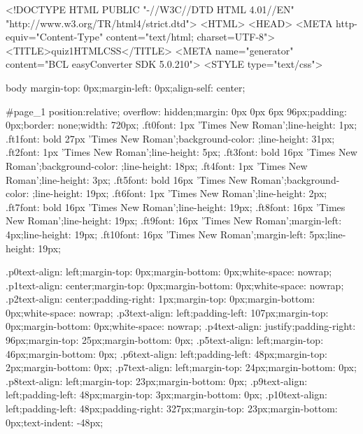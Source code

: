 <!DOCTYPE HTML PUBLIC "-//W3C//DTD HTML 4.01//EN" "http://www.w3.org/TR/html4/strict.dtd">
<HTML>
<HEAD>
<META http-equiv="Content-Type" content="text/html; charset=UTF-8">
<TITLE>quiz1HTMLCSS</TITLE>
<META name="generator" content="BCL easyConverter SDK 5.0.210">
<STYLE type="text/css">

body {margin-top: 0px;margin-left: 0px;align-self: center;}

#page_1 {position:relative; overflow: hidden;margin: 0px 0px 6px 96px;padding: 0px;border: none;width: 720px;}
.ft0{font: 1px 'Times New Roman';line-height: 1px;}
.ft1{font: bold 27px 'Times New Roman';background-color: ;line-height: 31px;}
.ft2{font: 1px 'Times New Roman';line-height: 5px;}
.ft3{font: bold 16px 'Times New Roman';background-color: ;line-height: 18px;}
.ft4{font: 1px 'Times New Roman';line-height: 3px;}
.ft5{font: bold 16px 'Times New Roman';background-color: ;line-height: 19px;}
.ft6{font: 1px 'Times New Roman';line-height: 2px;}
.ft7{font: bold 16px 'Times New Roman';line-height: 19px;}
.ft8{font: 16px 'Times New Roman';line-height: 19px;}
.ft9{font: 16px 'Times New Roman';margin-left: 4px;line-height: 19px; }
.ft10{font: 16px 'Times New Roman';margin-left: 5px;line-height: 19px;}

.p0{text-align: left;margin-top: 0px;margin-bottom: 0px;white-space: nowrap;}
.p1{text-align: center;margin-top: 0px;margin-bottom: 0px;white-space: nowrap;}
.p2{text-align: center;padding-right: 1px;margin-top: 0px;margin-bottom: 0px;white-space: nowrap;}
.p3{text-align: left;padding-left: 107px;margin-top: 0px;margin-bottom: 0px;white-space: nowrap;}
.p4{text-align: justify;padding-right: 96px;margin-top: 25px;margin-bottom: 0px;}
.p5{text-align: left;margin-top: 46px;margin-bottom: 0px;}
.p6{text-align: left;padding-left: 48px;margin-top: 2px;margin-bottom: 0px;}
.p7{text-align: left;margin-top: 24px;margin-bottom: 0px;}
.p8{text-align: left;margin-top: 23px;margin-bottom: 0px;}
.p9{text-align: left;padding-left: 48px;margin-top: 3px;margin-bottom: 0px;}
.p10{text-align: left;padding-left: 48px;padding-right: 327px;margin-top: 23px;margin-bottom: 0px;text-indent: -48px;}

